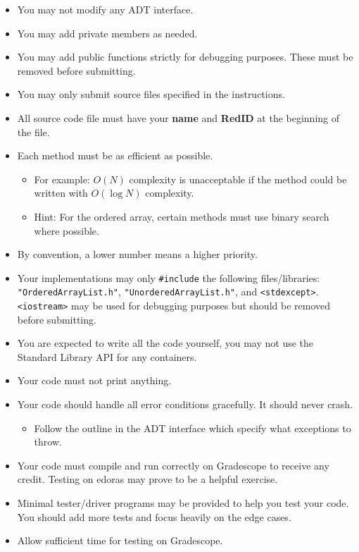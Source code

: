 \documentclass[12pt]{article}
\begin{document}
\begin{itemize}
    \item You may not modify any ADT interface.
    \item You may add private members as needed.
    \item You may add public functions strictly for debugging purposes. These must be removed before submitting.
    \item You may only submit source files specified in the instructions.
    \item All source code file must have your \textbf{name} and \textbf{RedID} at the beginning of the file.
    \item Each method must be as efficient as possible.
    \begin{itemize}
        \item For example: $O(N)$ complexity is unacceptable if the method could be written with $O(\log N)$ complexity.
        \item Hint: For the ordered array, certain methods must use binary search where possible.
    \end{itemize}
    \item By convention, a lower number means a higher priority.
    \item Your implementations may only \verb|#include| the following files/libraries: \verb|"OrderedArrayList.h"|, \verb|"UnorderedArrayList.h"|,
    and \verb|<stdexcept>|. \verb|<iostream>| may be used for debugging purposes but should be removed before submitting.
    \item You are expected to write all the code yourself, you may not use the Standard Library API for any containers.
    \item Your code must not print anything.
    \item Your code should handle all error conditions gracefully. It should never crash.
    \begin{itemize}
        \item Follow the outline in the ADT interface which specify what exceptions to throw.
    \end{itemize}
    \item Your code must compile and run correctly on Gradescope to receive any credit. Testing on edoras may prove to be a helpful exercise.
    \item Minimal tester/driver programs may be provided to help you test your code. You should add more tests and focus heavily on the edge cases.
    \item Allow sufficient time for testing on Gradescope.
\end{itemize}
\end{document}
